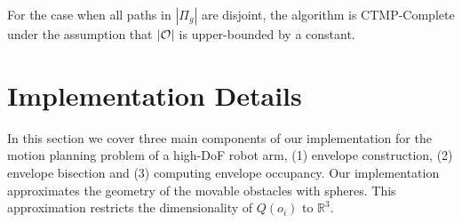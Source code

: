 \documentclass[a4paper]{report}
\begin{document}
\vspace{2mm}
\begin{theorem}
	For the case when all paths in $|\Pi_g|$ are disjoint, the algorithm is CTMP-Complete under the assumption that $|\mathcal{O}|$ is upper-bounded by a constant.
\end{theorem}

\section{Implementation Details} %
In this section we cover three main components of our implementation for the motion planning problem of a high-DoF robot arm, (1) envelope construction, (2) envelope bisection and (3) computing envelope occupancy.
%
Our implementation approximates the geometry of the movable obstacles with spheres. This approximation restricts the dimensionality of $Q(o_i)$ to $\mathbb{R}^3$.
\end{document}
